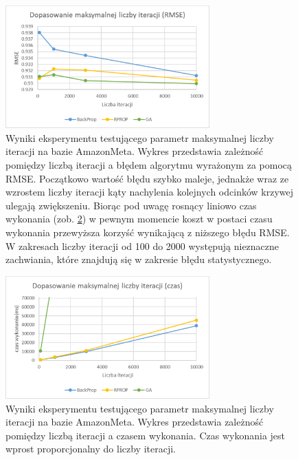 \documentclass[twoside]{iisthesis}
\begin{document}
			\begin{figure}[!ht]
				\centering
				\includegraphics[width=0.7\textwidth]{am_expiterations_rmse}		
				\caption{Wyniki eksperymentu testującego parametr maksymalnej liczby iteracji na bazie AmazonMeta. Wykres przedstawia zależność pomiędzy liczbą iteracji a błędem algorytmu wyrażonym za pomocą RMSE. Początkowo wartość błędu szybko maleje, jednakże wraz ze wzrostem liczby iteracji kąty nachylenia kolejnych odcinków krzywej ulegają zwiększeniu. Biorąc pod uwagę rosnący liniowo czas wykonania (zob. \ref{fig:am_expiterations_time}) w pewnym momencie koszt w postaci czasu wykonania przewyższa korzyść wynikającą z niższego błędu RMSE. W zakresach liczby iteracji od 100 do 2000 występują nieznaczne zachwiania, które znajdują się w zakresie błędu statystycznego. }
				\label{fig:am_expiterations_rmse}
			\end{figure}
			
			\begin{figure}[!ht]
				\centering
				\includegraphics[width=0.7\textwidth]{am_expiterations_time}			
				\caption{Wyniki eksperymentu testującego parametr maksymalnej liczby iteracji na bazie AmazonMeta. Wykres przedstawia zależność pomiędzy liczbą iteracji a czasem wykonania. Czas wykonania jest wprost proporcjonalny do liczby iteracji. }
				\label{fig:am_expiterations_time}
			\end{figure}
		
\end{document}
